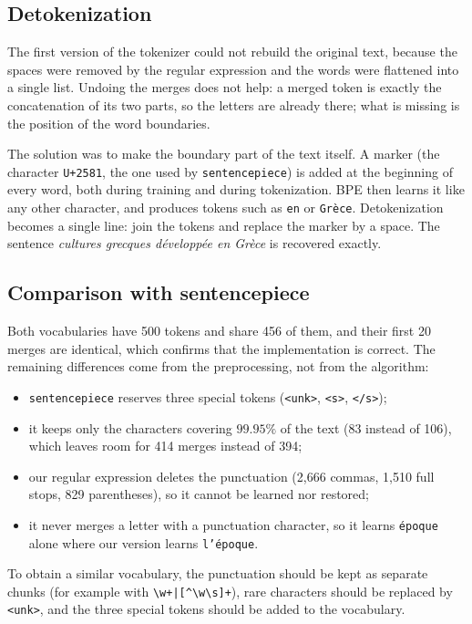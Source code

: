 \subsection*{Detokenization}

The first version of the tokenizer could not rebuild the original text, because the
spaces were removed by the regular expression and the words were flattened into a single
list. Undoing the merges does not help: a merged token is exactly the concatenation of
its two parts, so the letters are already there; what is missing is the position of the
word boundaries.

The solution was to make the boundary part of the text itself. A marker \mk{} (the
character \texttt{U+2581}, the one used by \texttt{sentencepiece}) is added at the
beginning of every word, both during training and during tokenization. BPE then learns
it like any other character, and produces tokens such as \mk\texttt{en} or
\mk\texttt{Grèce}. Detokenization becomes a single line: join the tokens and replace the
marker by a space. The sentence \emph{cultures grecques développée en Grèce} is
recovered exactly.

\subsection*{Comparison with sentencepiece}

Both vocabularies have 500 tokens and share 456 of them, and their first 20 merges are
identical, which confirms that the implementation is correct. The remaining differences
come from the preprocessing, not from the algorithm:

\begin{itemize}
  \item \texttt{sentencepiece} reserves three special tokens
        (\texttt{<unk>}, \texttt{<s>}, \texttt{</s>});
  \item it keeps only the characters covering $99.95\%$ of the text (83 instead of 106),
        which leaves room for 414 merges instead of 394;
  \item our regular expression deletes the punctuation (2{,}666 commas, 1{,}510 full
        stops, 829 parentheses), so it cannot be learned nor restored;
  \item it never merges a letter with a punctuation character, so it learns
        \texttt{époque} alone where our version learns \mk\texttt{l'époque}.
\end{itemize}

To obtain a similar vocabulary, the punctuation should be kept as separate chunks (for
example with \verb!\w+|[^\w\s]+!), rare characters should be replaced by \texttt{<unk>},
and the three special tokens should be added to the vocabulary.

